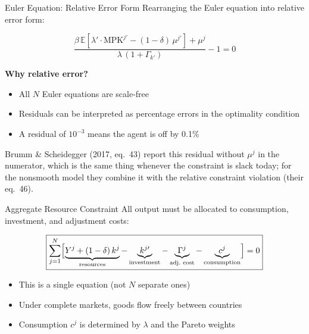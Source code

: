 \documentclass[aspectratio=169,11pt]{beamer}
\newcommand{\emphc}[1]{\textcolor{harvardcrimson}{#1}}
\newcommand{\E}[1]{\mathbb{E}\!\left[#1\right]}
\begin{document}
\begin{frame}{Euler Equation: Relative Error Form}
Rearranging the Euler equation into \emphc{relative error} form:

\[
\boxed{
\frac{\beta\,\E{\lambda' \cdot \text{MPK}^{j\prime} - (1-\delta)\,\mu^{j\prime}} + \mu^j}{\lambda\,(1 + \Gamma_{k'})} - 1 = 0
}
\]

\vspace{0.5em}
\textbf{Why relative error?}
\begin{itemize}
    \item All $N$ Euler equations are \emphc{scale-free}
    \item Residuals can be interpreted as \emphc{percentage errors} in the optimality condition
    \item A residual of $10^{-3}$ means the agent is off by 0.1\%
\end{itemize}

\vspace{0.3em}
{\small Brumm \& Scheidegger (2017, eq.\ 43) report this residual without $\mu^j$ in the numerator, which is the same thing whenever the constraint is slack today; for the nonsmooth model they combine it with the relative constraint violation (their eq.\ 46).}
\end{frame}

\begin{frame}{Aggregate Resource Constraint}
All output must be allocated to consumption, investment, and adjustment costs:

\[
\boxed{
\sum_{j=1}^{N} \Bigl[\underbrace{Y^j + (1-\delta)\,k^j}_{\text{resources}} - \underbrace{k^{j\prime}}_{\text{investment}} - \underbrace{\Gamma^j}_{\text{adj.\ cost}} - \underbrace{c^j}_{\text{consumption}}\Bigr] = 0
}
\]

\vspace{0.5em}
\begin{itemize}
    \item This is a \emphc{single} equation (not $N$ separate ones)
    \item Under complete markets, goods flow freely between countries
    \item Consumption $c^j$ is determined by $\lambda$ and the Pareto weights
\end{itemize}
\end{frame}
\end{document}
